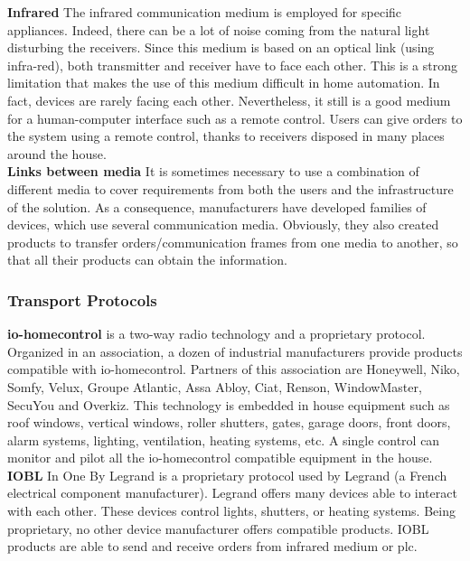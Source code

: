 {\bf Infrared} The infrared communication medium is employed for specific appliances. Indeed, there can be a lot of noise coming from the natural light disturbing the receivers. Since this medium is based on an optical link (using infra-red), both transmitter and receiver have to face each other. This is a strong limitation that makes the use of this medium difficult in home automation. In fact, devices are rarely facing each other.
Nevertheless, it still is a good medium for a human-computer interface such as a remote control. Users can give orders to the system using a remote control, thanks to receivers disposed in many places around the house.\\

{\bf Links between media} It is sometimes necessary to use a combination of different media to cover requirements from both the users and the infrastructure of the solution. As a consequence, manufacturers have developed families of devices, which use several communication media. Obviously, they also created products to transfer orders/communication frames from one media to another, so that all their products can obtain the information.\\

\subsubsection{Transport Protocols}

{\bf io-homecontrol\up{\textregistered}} is a two-way radio technology and a proprietary protocol. Organized in an association, a dozen of industrial manufacturers provide products compatible with io-homecontrol. Partners of this association are Honeywell, Niko, Somfy, Velux, Groupe Atlantic, Assa Abloy, Ciat, Renson, WindowMaster, SecuYou and Overkiz. This technology is embedded in house equipment such as roof windows, vertical windows, roller shutters, gates, garage doors, front doors, alarm systems, lighting, ventilation, heating systems, etc. A single control can monitor and pilot all the io-homecontrol compatible equipment in the house.\\

{\bf IOBL} In One By Legrand is a proprietary protocol used by Legrand (a French electrical component manufacturer). Legrand offers many devices able to interact with each other. These devices control lights, shutters, or heating systems. Being proprietary, no other device manufacturer offers compatible products. IOBL products are able to send and receive orders from infrared medium or \gls{plc}.\\

